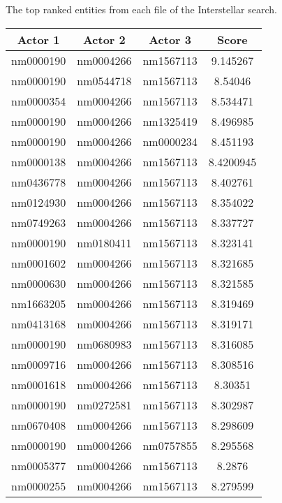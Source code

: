 The top ranked entities from each file of the Interstellar search.

\begin{table}[H]
    \centering
        \begin{tabular}{ |c|c|c|c| } 
            \hline
            \textbf{Actor 1} & \textbf{Actor 2} & \textbf{Actor 3} & \textbf{Score} \\ 
            \hline
            nm0000190 & nm0004266 & nm1567113 & 9.145267 \\
            nm0000190 & nm0544718 & nm1567113 & 8.54046 \\
            nm0000354 & nm0004266 & nm1567113 & 8.534471 \\
            nm0000190 & nm0004266 & nm1325419 & 8.496985 \\
            nm0000190 & nm0004266 & nm0000234 & 8.451193 \\
            nm0000138 & nm0004266 & nm1567113 & 8.4200945 \\
            nm0436778 & nm0004266 & nm1567113 & 8.402761 \\
            nm0124930 & nm0004266 & nm1567113 & 8.354022 \\
            nm0749263 & nm0004266 & nm1567113 & 8.337727 \\
            nm0000190 & nm0180411 & nm1567113 & 8.323141 \\
            nm0001602 & nm0004266 & nm1567113 & 8.321685 \\
            nm0000630 & nm0004266 & nm1567113 & 8.321585 \\
            nm1663205 & nm0004266 & nm1567113 & 8.319469 \\
            nm0413168 & nm0004266 & nm1567113 & 8.319171 \\
            nm0000190 & nm0680983 & nm1567113 & 8.316085 \\
            nm0009716 & nm0004266 & nm1567113 & 8.308516 \\
            nm0001618 & nm0004266 & nm1567113 & 8.30351 \\
            nm0000190 & nm0272581 & nm1567113 & 8.302987 \\
            nm0670408 & nm0004266 & nm1567113 & 8.298609 \\
            nm0000190 & nm0004266 & nm0757855 & 8.295568 \\
            nm0005377 & nm0004266 & nm1567113 & 8.2876 \\
            nm0000255 & nm0004266 & nm1567113 & 8.279599 \\

\end{tabular}
\end{table}
